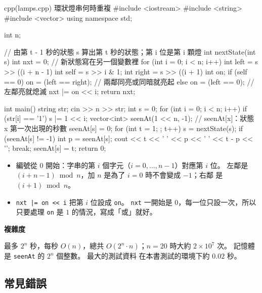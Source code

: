\begin{example}[label=ex:lamps]{cpp}{(lamps.cpp) 環狀燈串何時重複}
#include <iostream>
#include <string>
#include <vector>
using namespace std;

int n;

// 由第 t - 1 秒的狀態 s 算出第 t 秒的狀態；第 i 位是第 i 顆燈
int nextState(int s) {
    int nxt = 0;                                // 新狀態寫在另一個變數裡
    for (int i = 0; i < n; i++) {
        int left = s >> ((i + n - 1) %
        int self = s >> i & 1;
        int right = s >> ((i + 1) %
        int on;
        if (self == 0) {
            on = (left == right);               // 兩鄰同亮或同暗就亮起
        } else {
            on = (left == 0);                   // 左鄰亮就熄滅
        }
        nxt |= on << i;
    }
    return nxt;
}

int main() {
    string str;
    cin >> n >> str;
    int s = 0;
    for (int i = 0; i < n; i++) {
        if (str[i] == '1') {
            s |= 1 << i;
        }
    }
    vector<int> seenAt(1 << n, -1);             // seenAt[x]：狀態 x 第一次出現的秒數
    seenAt[s] = 0;
    for (int t = 1; ; t++) {
        s = nextState(s);
        if (seenAt[s] != -1) {
            int p = seenAt[s];
            cout << t << ' ' << p << ' ' << t - p << '\n';
            break;
        }
        seenAt[s] = t;
    }
    return 0;
}
\end{example}


\begin{itemize}
\item 編號從 $0$ 開始：字串的第 $i$ 個字元（$i = 0, \ldots, n - 1$）對應第 $i$
位。 左鄰是 $(i + n - 1) \bmod n$，加 $n$ 是為了 $i = 0$ 時不會變成 $-1$；右鄰
是 $(i + 1) \bmod n$。
\item \texttt{nxt |= on << i} 把第 $i$ 位設成 \texttt{on}。 \texttt{nxt} 一開始是
$0$，每一位只設一次，所以只要處理 \texttt{on} 是 $1$ 的情況，寫成「或」就好。
\end{itemize}

\textbf{複雜度}

最多 $2^n$ 秒，每秒 $O(n)$，總共 $O(2^n \cdot n)$；$n = 20$ 時大約
$2 \times 10^7$ 次。 記憶體是 \texttt{seenAt} 的 $2^n$ 個整數。 最大的測試資料
在本書測試的環境下約 $0.02$ 秒。

\subsection{常見錯誤}

